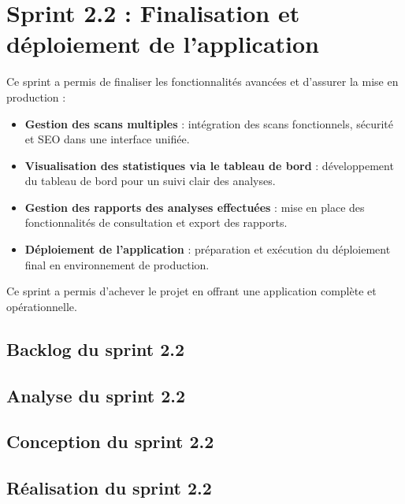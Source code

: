 \section{Sprint 2.2 : Finalisation et déploiement de l’application}
Ce sprint a permis de finaliser les fonctionnalités avancées et d’assurer la mise en production :
\begin{itemize}[label=$-$]
    \item \textbf{Gestion des scans multiples} : intégration des scans fonctionnels, sécurité et SEO dans une interface unifiée.
    \item \textbf{Visualisation des statistiques via le tableau de bord} : développement du tableau de bord pour un suivi clair des analyses.
    \item \textbf{Gestion des rapports des analyses effectuées} : mise en place des fonctionnalités de consultation et export des rapports.
    \item \textbf{Déploiement de l’application} : préparation et exécution du déploiement final en environnement de production.
\end{itemize}
Ce sprint a permis d’achever le projet en offrant une application complète et opérationnelle.

\subsection{Backlog du sprint 2.2}  


\subsection{Analyse du sprint 2.2}


\subsection{Conception du sprint 2.2}


\subsection{Réalisation du sprint 2.2}


